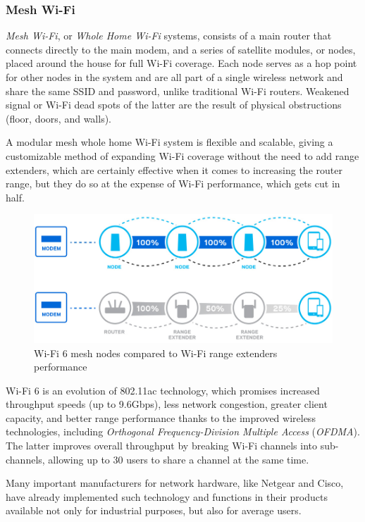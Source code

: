 			\subsubsection{Mesh Wi-Fi}
					
				\textit{Mesh Wi-Fi}, or \textit{Whole Home Wi-Fi} systems, consists of a main router that connects directly to the main modem, and a series of satellite modules, or nodes, placed around the house for full Wi-Fi coverage.
				Each node serves as a hop point for other nodes in the system and are all part of a single wireless network and share the same SSID and password, unlike traditional Wi-Fi routers.
				Weakened signal or Wi-Fi dead spots of the latter are the result of physical obstructions (floor, doors, and walls).
				
				A modular mesh whole home Wi-Fi system is flexible and scalable, giving a customizable method of expanding Wi-Fi coverage without the need to add range extenders, which are certainly effective when it comes to increasing the router range, but they do so at the expense of Wi-Fi performance, which gets cut in half.
			
				\begin{figure}
					\centering
					\includegraphics[width=.9\textwidth]{resources/img/chap4/wifi6}
					\caption{Wi-Fi 6 mesh nodes compared to Wi-Fi range extenders performance}
					\label{img:Wi-Fi6}
				\end{figure}
				
				Wi-Fi 6 is an evolution of 802.11ac technology, which promises increased throughput speeds (up to 9.6Gbps), less network congestion, greater client capacity, and better range performance thanks to the improved wireless technologies, including \textit{Orthogonal Frequency-Division Multiple Access} (\textit{OFDMA}).
				The latter improves overall throughput by breaking Wi-Fi channels into sub-channels, allowing up to 30 users to share a channel at the same time.
				
				Many important manufacturers for network hardware, like Netgear and Cisco, have already implemented such technology and functions in their products available not only for industrial purposes, but also for average users.
				